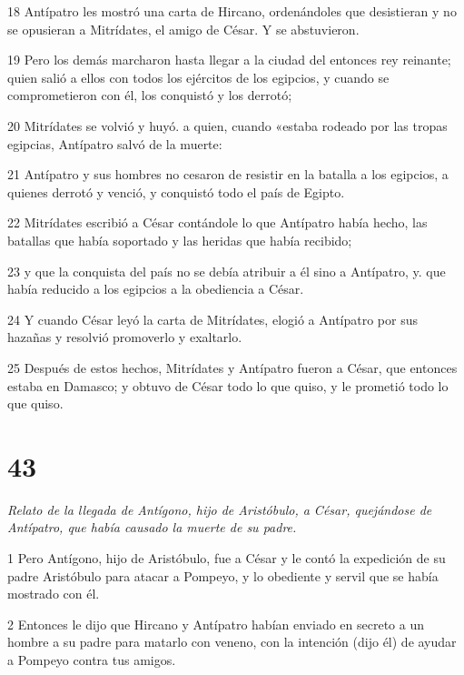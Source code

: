 \par 18 Antípatro les mostró una carta de Hircano, ordenándoles que desistieran y no se opusieran a Mitrídates, el amigo de César. Y se abstuvieron.

\par 19 Pero los demás marcharon hasta llegar a la ciudad del entonces rey reinante; quien salió a ellos con todos los ejércitos de los egipcios, y cuando se comprometieron con él, los conquistó y los derrotó;

\par 20 Mitrídates se volvió y huyó. a quien, cuando «estaba rodeado por las tropas egipcias, Antípatro salvó de la muerte:

\par 21 Antípatro y sus hombres no cesaron de resistir en la batalla a los egipcios, a quienes derrotó y venció, y conquistó todo el país de Egipto.

\par 22 Mitrídates escribió a César contándole lo que Antípatro había hecho, las batallas que había soportado y las heridas que había recibido;

\par 23 y que la conquista del país no se debía atribuir a él sino a Antípatro, y. que había reducido a los egipcios a la obediencia a César.

\par 24 Y cuando César leyó la carta de Mitrídates, elogió a Antípatro por sus hazañas y resolvió promoverlo y exaltarlo.

\par 25 Después de estos hechos, Mitrídates y Antípatro fueron a César, que entonces estaba en Damasco; y obtuvo de César todo lo que quiso, y le prometió todo lo que quiso.

\chapter{43}

\par \textit{Relato de la llegada de Antígono, hijo de Aristóbulo, a César, quejándose de Antípatro, que había causado la muerte de su padre.}

\par 1 Pero Antígono, hijo de Aristóbulo, fue a César y le contó la expedición de su padre Aristóbulo para atacar a Pompeyo, y lo obediente y servil que se había mostrado con él.

\par 2 Entonces le dijo que Hircano y Antípatro habían enviado en secreto a un hombre a su padre para matarlo con veneno, con la intención (dijo él) de ayudar a Pompeyo contra tus amigos.

